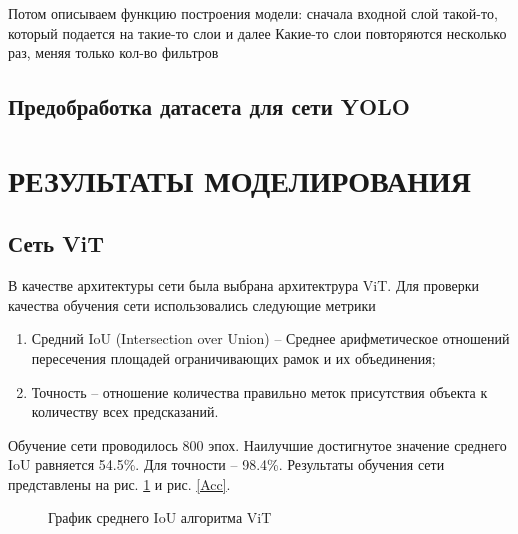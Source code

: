 \documentclass[14pt,a4paper]{extarticle}
\begin{document}
Потом описываем функцию построения модели: сначала входной слой такой-то, который подается на такие-то слои и далее
Какие-то слои повторяются несколько раз, меняя только кол-во фильтров

\newpage
\subsection{Предобработка датасета для сети YOLO}

\newpage
\section{РЕЗУЛЬТАТЫ МОДЕЛИРОВАНИЯ}
\subsection{Сеть ViT}

В качестве архитектуры сети была выбрана архитектрура ViT.
Для проверки качества обучения сети использовались следующие метрики
\begin{enumerate}
\item Средний IoU (Intersection over Union) -- Среднее арифметическое отношений пересечения площадей ограничивающих рамок и их объединения;
\item Точность -- отношение количества правильно меток присутствия объекта к количеству всех предсказаний.
\end{enumerate}

Обучение сети проводилось 800 эпох. Наилучшие достигнутое значение среднего IoU равняется 54.5\%. Для точности  -- 98.4\%. Результаты обучения сети представлены на рис. \ref{mIoU} и рис. \ref{Acc}.
\begin{figure}[h!]
\caption{График среднего IoU алгоритма ViT}
\label{mIoU}
\end{figure} 
\end{document}
